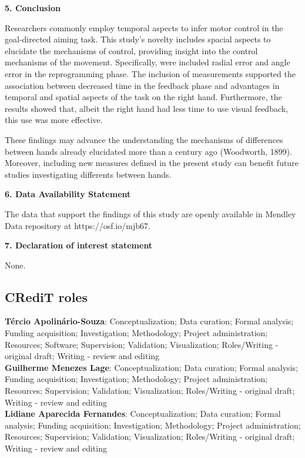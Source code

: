 \documentclass[man,a4paper,12pt,floatsintext]{apa6}
\begin{document}
\begin{flushleft}
\textbf{5. Conclusion}
\end{flushleft}

Researchers commonly employ temporal aspects to infer motor control in the goal-directed aiming task. This study's novelty includes spacial aspects to elucidate the mechanisms of control,  providing insight into the control mechanisms of the movement. Specifically, were included radial error and angle error in the reprogramming phase. The inclusion of measurements supported the association between decreased time in the feedback phase and advantages in temporal and spatial aspects of the task on the right hand. Furthermore, the results showed that, albeit the right hand had less time to use visual feedback, this use was more effective.   

These findings may advance the understanding the mechanisms of differences between hands already elucidated more than a century ago (Woodworth, 1899). Moreover, including new measures defined in the present study can benefit future studies investigating differents between hands.

\begin{flushleft}
\textbf{6. Data Availability Statement}
\end{flushleft}
	
The data that support the findings of this study are openly available in Mendley Data repository at https://osf.io/mjb67.
	
	

	
\begin{flushleft}
\textbf{7. Declaration of interest statement}
\end{flushleft}
	
None.
	
	
	
\subsection{CRediT roles}
\textbf{Tércio Apolinário-Souza}: Conceptualization; Data curation; Formal analysis; Funding acquisition; Investigation; Methodology; Project administration; Resources; Software; Supervision; Validation; Visualization; Roles/Writing - original draft; Writing - review and editing\\
\textbf{Guilherme Menezes Lage}: Conceptualization; Data curation; Formal analysis; Funding acquisition; Investigation; Methodology; Project administration; Resources; Supervision; Validation; Visualization; Roles/Writing - original draft; Writing - review and editing\\
\textbf{Lidiane Aparecida Fernandes}: Conceptualization; Data curation; Formal analysis; Funding acquisition; Investigation; Methodology; Project administration; Resources; Supervision; Validation; Visualization; Roles/Writing - original draft; Writing - review and editing\\	
\end{document}
